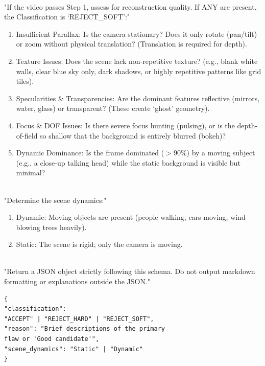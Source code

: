 \vspace{0.5em}
 \\
"If the video passes Step 1, assess for reconstruction quality. If ANY are present, the Classification is {`REJECT\_SOFT'}:"
\begin{enumerate}[noitemsep, topsep=0pt, leftmargin=*]
    \item Insufficient Parallax: Is the camera stationary? Does it only rotate (pan/tilt) or zoom without physical translation? (Translation is required for depth).
    \item Texture Issues: Does the scene lack non-repetitive texture? (e.g., blank white walls, clear blue sky only, dark shadows, or highly repetitive patterns like grid tiles).
    \item Specularities \& Transparencies: Are the dominant features reflective (mirrors, water, glass) or transparent? (These create `ghost' geometry).
    \item Focus \& DOF Issues: Is there severe focus hunting (pulsing), or is the depth-of-field so shallow that the background is entirely blurred (bokeh)?
    \item Dynamic Dominance: Is the frame dominated ($>$90$\%$) by a moving subject (e.g., a close-up talking head) while the static background is visible but minimal?
\end{enumerate}

\vspace{0.5em}
\\
"Determine the scene dynamics:"
\begin{enumerate}[noitemsep, topsep=0pt, leftmargin=*]
    \item Dynamic: Moving objects are present (people walking, cars moving, wind blowing trees heavily).
    \item Static: The scene is rigid; only the camera is moving.
\end{enumerate}

\vspace{0.5em}
 \\
"Return a JSON object strictly following this schema. Do not output markdown formatting or explanations outside the JSON."
\begin{verbatim}
{
"classification": 
"ACCEPT" | "REJECT_HARD" | "REJECT_SOFT",
"reason": "Brief descriptions of the primary 
flaw or 'Good candidate'",
"scene_dynamics": "Static" | "Dynamic"
}
\end{verbatim}


